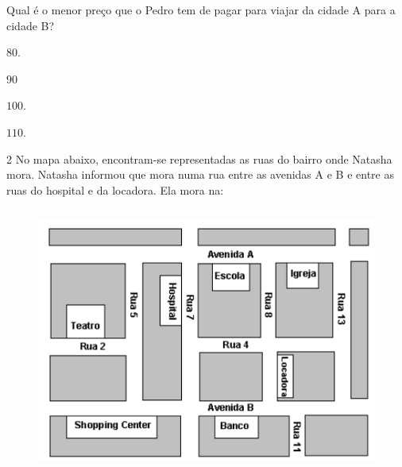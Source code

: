 \noindent Qual é o menor preço que o Pedro tem de pagar para viajar da cidade A
para a cidade B?

\begin{escolha}
\item $80$.
\item $90$
\item $100$.
\item $110$.
\end{escolha}



\num{2}  No mapa abaixo, encontram-se representadas as ruas do bairro onde
Natasha mora. Natasha informou que mora numa rua entre as avenidas A e B e entre as
ruas do hospital e da locadora. Ela mora na:

\begin{figure}
\includegraphics[width=4.76042in,height=3.42708in]{./imgSAEB_6_MAT/media/image75.png}
\end{figure}

